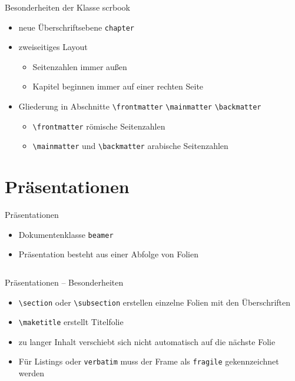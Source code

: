 \documentclass[presentation,aspectratio=169]{beamer}
\begin{document}
\begin{frame}[fragile]{Besonderheiten der Klasse scrbook}
  \begin{itemize}
    \item neue Überschriftsebene \verb|chapter|
    \item zweiseitiges Layout
      \begin{itemize}
        \item Seitenzahlen immer außen
        \item Kapitel beginnen immer auf einer rechten Seite
      \end{itemize}
    \item Gliederung in Abschnitte \verb|\frontmatter| \verb|\mainmatter| \verb|\backmatter|
      \begin{itemize}
        \item \verb|\frontmatter| römische Seitenzahlen
        \item \verb|\mainmatter| und \verb|\backmatter| arabische Seitenzahlen
      \end{itemize}
  \end{itemize}
\end{frame}

\section{Präsentationen}

\begin{frame}[fragile]{Präsentationen}
  \begin{itemize}
    \item Dokumentenklasse \verb|beamer|
    \item Präsentation besteht aus einer Abfolge von Folien
      \inputminted{latex}{codebeispiele/beamer-frame.tex}
  \end{itemize}
\end{frame}

\begin{frame}[fragile]{Präsentationen -- Besonderheiten}
  \begin{itemize}
    \item \verb|\section| oder \verb|\subsection| erstellen einzelne Folien mit den Überschriften
    \item \verb|\maketitle| erstellt Titelfolie
    \item zu langer Inhalt verschiebt sich nicht automatisch auf die nächste Folie
    \item Für Listings oder \verb|verbatim| muss der Frame als \verb|fragile| gekennzeichnet werden
      \inputminted{latex}{codebeispiele/frame-fragile.tex}
  \end{itemize}
\end{frame}
\end{document}
